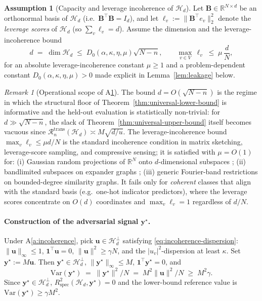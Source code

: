 \documentclass[11pt,a4paper]{article}
\theoremstyle{plain}
\theoremstyle{definition}
\newtheorem{assumption}[theorem]{Assumption}
\theoremstyle{remark}
\newtheorem{remark}[theorem]{Remark}
\newcommand{\by}{\mathbf{y}}
\newcommand{\bB}{\mathbf{B}}
\newcommand{\bu}{\mathbf{u}}
\newcommand{\bone}{\mathbf{1}}
\newcommand{\R}{\mathbb{R}}
\newcommand{\Var}{\mathrm{Var}}
\newcommand{\Rspec}{R^2_{\mathrm{spec}}}
\newcommand{\Hcal}{\mathcal{H}}
\begin{document}
\begin{assumption}[Capacity and leverage incoherence of $\Hcal_d$]
\label{a:capacity}
Let $\bB \in \R^{N \times d}$ be an orthonormal basis of $\Hcal_d$
(i.e.\ $\bB^\top \bB = I_d$), and let $\ell_v := \|\bB^\top e_v\|_2^2$
denote the \emph{leverage scores} of $\Hcal_d$ (so $\sum_v \ell_v = d$).
Assume the dimension and the leverage-incoherence bound
\begin{equation}
    d \;=\; \dim \Hcal_d \;\le\; D_0(\alpha, \kappa, \eta, \mu)\sqrt{N - n},
    \qquad
    \max_{v \in V}\, \ell_v \;\le\; \mu\,\frac{d}{N},
    \label{eq:capacity-leverage}
\end{equation}
for an absolute leverage-incoherence constant $\mu \ge 1$ and a
problem-dependent constant $D_0(\alpha, \kappa, \eta, \mu) > 0$ made
explicit in Lemma~\ref{lem:leakage} below.
\end{assumption}

\begin{remark}[Operational scope of A\ref{a:capacity}]
\label{rem:capacity-when}
The bound $d = O(\sqrt{N-n})$ is the regime in which the structural
floor of Theorem~\ref{thm:universal-lower-bound} is informative and
the held-out evaluation is statistically non-trivial: for $d \gg
\sqrt{N-n}$, the slack of Theorem~\ref{thm:universal-upper-bound}
itself becomes vacuous since $\mathcal{R}^{\mathrm{trans}}_n(\Hcal_d)
\asymp M\sqrt{d/u}$.  The leverage-incoherence bound $\max_v \ell_v
\le \mu d/N$ is the standard incoherence condition in matrix
sketching, leverage-score sampling, and compressive sensing; it is
satisfied with $\mu = O(1)$ for: (i) Gaussian random projections of
$\R^N$ onto $d$-dimensional subspaces \citep{Tropp2015};
(ii) bandlimited subspaces on expander graphs
\citep{Cohen2016sparsification}; (iii) generic Fourier-band
restrictions on bounded-degree similarity graphs.  It fails only for
\emph{coherent} classes that align with the standard basis (e.g.\
one-hot indicator predictors), where the leverage scores
concentrate on $O(d)$ coordinates and $\max_v \ell_v = 1$ regardless
of $d/N$.
\end{remark}

\paragraph{Construction of the adversarial signal $\by^\star$.}

Under A\ref{a:incoherence}, pick $\bu \in \Hcal_d^\perp$ satisfying
\eqref{eq:incoherence-dispersion}: $\|\bu\|_\infty \le 1$,
$\bone^\top\bu = 0$, $\|\bu\|^2 \ge \gamma N$, and the
$|u_v|^2$-dispersion at least $\kappa$. Set $\by^\star := M\bu$.
Then $\by^\star \in \Hcal_d^\perp$, $\|\by^\star\|_\infty \le M$,
$\bone^\top\by^\star = 0$, and
\[
    \Var(\by^\star) \;=\; \|\by^\star\|^2/N \;=\; M^2 \|\bu\|^2/N
        \;\ge\; M^2 \gamma.
\]
Since $\by^\star \in \Hcal_d^\perp$, $\Rspec(\Hcal_d, \by^\star) = 0$
and the lower-bound reference value is $\Var(\by^\star) \ge \gamma M^2$.
\end{document}
